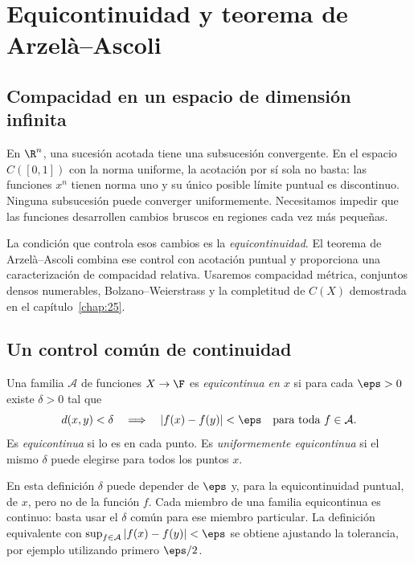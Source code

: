 \chapter{Equicontinuidad y teorema de Arzelà--Ascoli}\label{cap:nuevo12}\label{chap:27}

\section{Compacidad en un espacio de dimensión infinita}
\label{lectura:27}
En $\R^n$, una sucesión acotada tiene una subsucesión convergente. En el espacio $C([0,1])$ con la norma uniforme, la acotación por sí sola no basta: las funciones $x^n$ tienen norma uno y su único posible límite puntual es discontinuo. Ninguna subsucesión puede converger uniformemente. Necesitamos impedir que las funciones desarrollen cambios bruscos en regiones cada vez más pequeñas.

La condición que controla esos cambios es la \emph{equicontinuidad}. El teorema de Arzelà--Ascoli combina ese control con acotación puntual y proporciona una caracterización de compacidad relativa. Usaremos compacidad métrica, conjuntos densos numerables, Bolzano--Weierstrass y la completitud de $C(X)$ demostrada en el capítulo~\ref{chap:25}.

\section{Un control común de continuidad}
\begin{definicion}
Una familia $\mathcal A$ de funciones $X\to\F$ es \emph{equicontinua en $x$} si para cada $\eps>0$ existe $\delta>0$ tal que
\[
 d(x,y)<\delta\quad\Longrightarrow\quad
 |f(x)-f(y)|<\eps\quad\text{para toda }f\in\mathcal A.
\]
Es \emph{equicontinua} si lo es en cada punto. Es \emph{uniformemente equicontinua} si el mismo $\delta$ puede elegirse para todos los puntos $x$.
\end{definicion}

En esta definición $\delta$ puede depender de $\eps$ y, para la equicontinuidad puntual, de $x$, pero no de la función $f$. Cada miembro de una familia equicontinua es continuo: basta usar el $\delta$ común para ese miembro particular. La definición equivalente con $\sup_{f\in\mathcal A}|f(x)-f(y)|<\eps$ se obtiene ajustando la tolerancia, por ejemplo utilizando primero $\eps/2$.

